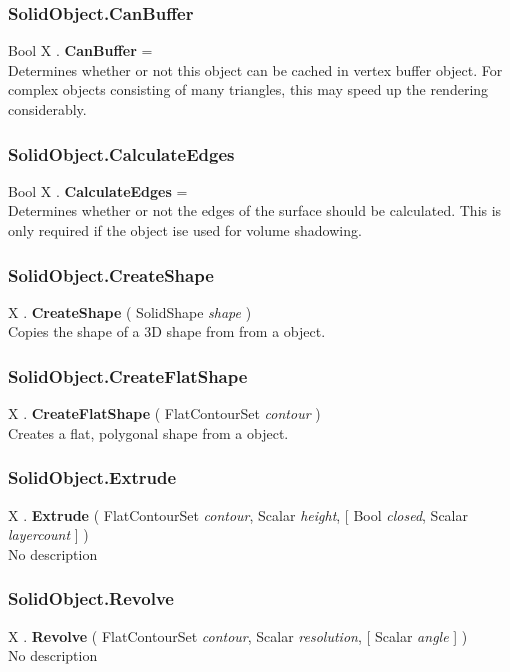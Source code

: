 \subsubsection{SolidObject.CanBuffer \label{F:SolidObject:CanBuffer}}
Bool X . \textbf{CanBuffer} = \\
Determines whether or not this object can be cached in vertex buffer object. For complex objects consisting of many triangles, this may speed up the rendering considerably.

\subsubsection{SolidObject.CalculateEdges \label{F:SolidObject:CalculateEdges}}
Bool X . \textbf{CalculateEdges} = \\
Determines whether or not the edges of the surface should be calculated. This is only required if the object ise used for volume shadowing.

\subsubsection{SolidObject.CreateShape \label{F:SolidObject:CreateShape}}
X . \textbf{CreateShape} ( SolidShape \textit{shape} ) \\
Copies the shape of a 3D shape from from a  object.

\subsubsection{SolidObject.CreateFlatShape \label{F:SolidObject:CreateFlatShape}}
X . \textbf{CreateFlatShape} ( FlatContourSet \textit{contour} ) \\
Creates a flat, polygonal shape from a  object.

\subsubsection{SolidObject.Extrude \label{F:SolidObject:Extrude}}
X . \textbf{Extrude} ( FlatContourSet \textit{contour}, Scalar \textit{height},  [ Bool \textit{closed}, Scalar \textit{layercount} ] ) \\
No description

\subsubsection{SolidObject.Revolve \label{F:SolidObject:Revolve}}
X . \textbf{Revolve} ( FlatContourSet \textit{contour}, Scalar \textit{resolution},  [ Scalar \textit{angle} ] ) \\
No description


